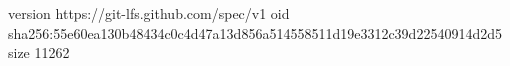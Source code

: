 version https://git-lfs.github.com/spec/v1
oid sha256:55e60ea130b48434c0c4d47a13d856a514558511d19e3312c39d22540914d2d5
size 11262
